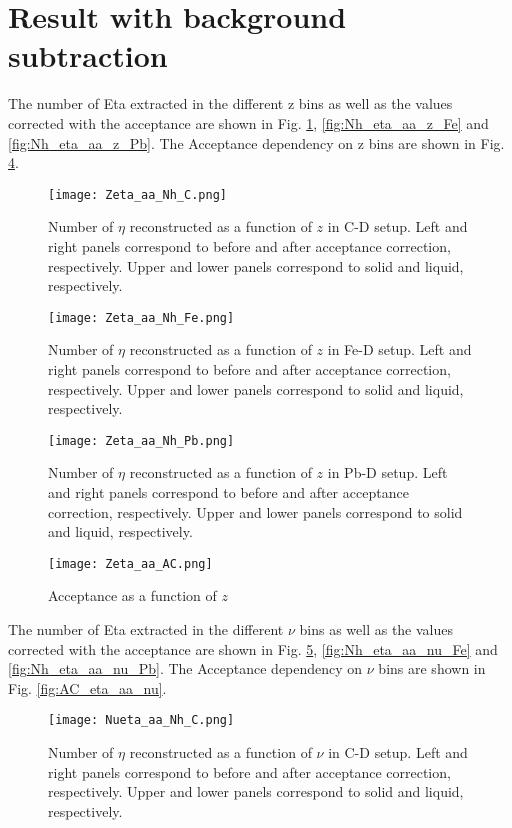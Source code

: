 \section{Result with background subtraction}
\label{sec:res_bkg_sub}
The number of Eta extracted in the different z bins as well as the values corrected with the acceptance are shown in Fig. \ref{fig:Nh_eta_aa_z_C}, \ref{fig:Nh_eta_aa_z_Fe} and \ref{fig:Nh_eta_aa_z_Pb}. The Acceptance dependency on z bins are shown in Fig. \ref{fig:AC_eta_aa_z}.
%
\begin{figure}[H]
\centering
\texttt{[image: Zeta\_aa\_Nh\_C.png]}
\caption{Number of $\eta$ reconstructed as a function of $z$ in C-D setup. Left and right panels correspond to before and after acceptance correction, respectively. Upper and lower panels correspond to solid and liquid, respectively.}
\label{fig:Nh_eta_aa_z_C}
\end{figure}
%
\begin{figure}[H]
\centering
\texttt{[image: Zeta\_aa\_Nh\_Fe.png]}
\caption{Number of $\eta$ reconstructed as a function of $z$ in Fe-D setup. Left and right panels correspond to before and after acceptance correction, respectively.  Upper and lower panels correspond to solid and liquid, respectively.}
\label{fig::Nh_eta_aa_z_Fe}
\end{figure}
%
\begin{figure}[H]
\centering
\texttt{[image: Zeta\_aa\_Nh\_Pb.png]}
\caption{Number of $\eta$ reconstructed as a function of $z$ in Pb-D setup. Left and right panels correspond to before and after acceptance correction, respectively.  Upper and lower panels correspond to solid and liquid, respectively.}
\label{fig::Nh_eta_aa_z_Pb}
\end{figure}
%
\begin{figure}[H]
\centering
\texttt{[image: Zeta\_aa\_AC.png]}
\caption{Acceptance as a function of $z$}
\label{fig:AC_eta_aa_z}
\end{figure}
%
\clearpage
The number of Eta extracted in the different $\nu$ bins as well as the values corrected with the acceptance are shown in Fig. \ref{fig:Nh_eta_aa_nu_C}, \ref{fig:Nh_eta_aa_nu_Fe} and \ref{fig:Nh_eta_aa_nu_Pb}. The Acceptance dependency on $\nu$ bins are shown in Fig. \ref{fig:AC_eta_aa_nu}.
\begin{figure}[H]
\centering
\texttt{[image: Nueta\_aa\_Nh\_C.png]}
\caption{Number of $\eta$ reconstructed as a function of $\nu$ in C-D setup. Left and right panels correspond to before and after acceptance correction, respectively. Upper and lower panels correspond to solid and liquid, respectively.}
\label{fig:Nh_eta_aa_nu_C}
\end{figure}
